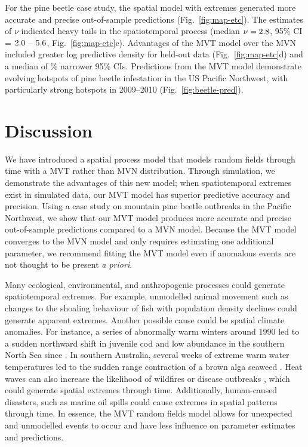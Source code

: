 \documentclass[12pt,english]{article}
\begin{document}
\begin{spacing}{1.9}
For the pine beetle case study, the spatial model with extremes generated more
accurate and precise out-of-sample predictions (Fig.~\ref{fig:map-etc}). The
estimates of $\nu$ indicated heavy tails in the spatiotemporal process (median
$\nu = 2.8$, 95\% CI = $2.0$ -- $5.6$,
Fig.~\ref{fig:map-etc}c). Advantages of the MVT model over the MVN included
greater log predictive density for held-out data (Fig.~\ref{fig:map-etc}d)
and a median of \medianPercSmallerCIsBeetles \% narrower 95\% CIs. Predictions
from the MVT model demonstrate evolving hotspots of pine beetle infestation in
the US Pacific Northwest, with particularly strong hotspots in 2009--2010
(Fig.~\ref{fig:beetle-pred}).


\section{Discussion}

We have introduced a spatial process model that models random fields through
time with a MVT rather than MVN distribution. Through simulation, we demonstrate
the advantages of this new model; when spatiotemporal extremes exist in
simulated data, our MVT model has superior predictive accuracy and precision.
Using a case study on mountain pine beetle outbreaks in the Pacific Northwest,
we show that our MVT model produces more accurate and precise out-of-sample
predictions compared to a MVN model. Because the MVT model converges to the MVN
model and only requires estimating one additional parameter, we recommend
fitting the MVT model even if anomalous events are not thought to be present
\textit{a priori}.

Many ecological, environmental, and anthropogenic processes could generate
spatiotemporal extremes. For example, unmodelled animal movement such as changes
to the shoaling behaviour of fish with population density declines
\citep[][]{rose1999} could generate apparent extremes. Another possible cause
could be spatial climate anomalies. For instance, a series of abnormally warm
winters around 1990 led to a sudden northward shift in juvenile cod and low
abundance in the southern North Sea since \citep{rindorf2006}. In southern
Australia, several weeks of extreme warm water temperatures led to the sudden
range contraction of a brown alga seaweed \citep{smale2013}. Heat waves can also
increase the likelihood of wildfires or disease outbreaks
\citep[e.g.][]{harvell2002}, which could generate spatial extremes through time.
Additionally, human-caused disasters, such as marine oil spills could cause
extremes in spatial patterns through time. In essence, the MVT random fields
model allows for unexpected and unmodelled events to occur and have less
influence on parameter estimates and predictions.


\end{spacing}
\end{document}

